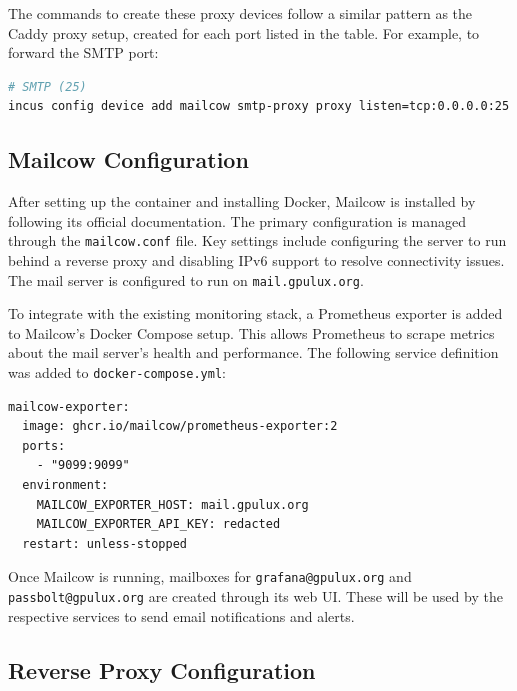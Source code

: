 The commands to create these proxy devices follow a similar pattern as the Caddy proxy setup, created for each port listed in the table. For example, to forward the SMTP port:

\begin{lstlisting}[language=bash,caption={Example of forwarding a port to the Mailcow container.}]
# SMTP (25)
incus config device add mailcow smtp-proxy proxy listen=tcp:0.0.0.0:25 connect=tcp:127.0.0.1:25
\end{lstlisting}

\subsection*{Mailcow Configuration}

After setting up the container and installing Docker, Mailcow is installed by following its official documentation\cite{mailcow-install}. The primary configuration is managed through the \texttt{mailcow.conf} file. Key settings include configuring the server to run behind a reverse proxy\cite{mailcow-reverse-proxy} and disabling IPv6 support to resolve connectivity issues\cite{mailcow-disable-ipv6}. The mail server is configured to run on \texttt{mail.gpulux.org}.

To integrate with the existing monitoring stack, a Prometheus exporter is added to Mailcow's Docker Compose setup. This allows Prometheus to scrape metrics about the mail server's health and performance. The following service definition was added to \texttt{docker\allowbreak-compose.yml}\cite{mailcow-prometheus-exporter}:

\begin{lstlisting}[caption={Docker Compose service for the Mailcow Prometheus exporter.}]
mailcow-exporter:
  image: ghcr.io/mailcow/prometheus-exporter:2
  ports:
    - "9099:9099"
  environment:
    MAILCOW_EXPORTER_HOST: mail.gpulux.org
    MAILCOW_EXPORTER_API_KEY: redacted
  restart: unless-stopped
\end{lstlisting}

Once Mailcow is running, mailboxes for \texttt{grafana@\allowbreak gpulux.org} and \texttt{passbolt@\allowbreak gpulux.org} are created through its web UI. These will be used by the respective services to send email notifications and alerts.

\subsection*{Reverse Proxy Configuration}

